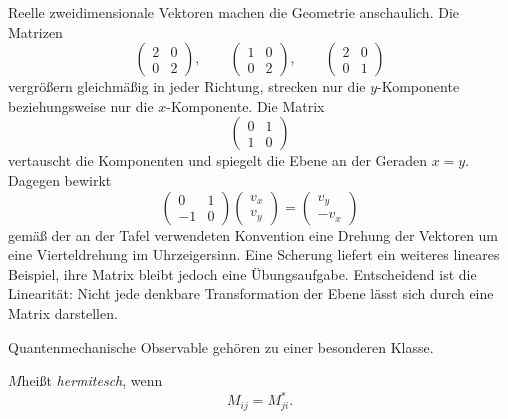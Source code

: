 Reelle zweidimensionale Vektoren machen die Geometrie anschaulich. Die Matrizen
\begin{equation}
  \begin{pmatrix}2&0\\0&2\end{pmatrix},
  \qquad
  \begin{pmatrix}1&0\\0&2\end{pmatrix},
  \qquad
  \begin{pmatrix}2&0\\0&1\end{pmatrix}
\end{equation}
vergrößern gleichmäßig in jeder Richtung, strecken nur die \(y\)-Komponente beziehungsweise nur die \(x\)-Komponente. Die Matrix
\begin{equation}
  \begin{pmatrix}0&1\\1&0\end{pmatrix}
\end{equation}
vertauscht die Komponenten und spiegelt die Ebene an der Geraden \(x=y\). Dagegen bewirkt
\begin{equation}
  \begin{pmatrix}0&1\\-1&0\end{pmatrix}
  \begin{pmatrix}v_x\\v_y\end{pmatrix}
  =
  \begin{pmatrix}v_y\\-v_x\end{pmatrix}
  \label{eq:l02-quarter-turn}
\end{equation}
gemäß der an der Tafel verwendeten Konvention eine Drehung der Vektoren um eine Vierteldrehung im Uhrzeigersinn. Eine Scherung liefert ein weiteres lineares Beispiel, ihre Matrix bleibt jedoch eine Übungsaufgabe. Entscheidend ist die Linearität: Nicht jede denkbare Transformation der Ebene lässt sich durch eine Matrix darstellen.

Quantenmechanische Observable gehören zu einer besonderen Klasse.

\begin{definition}\(M\)heißt \emph{hermitesch}, wenn
\begin{equation}
  M_{ij}=M_{ji}^*.
  \label{eq:l02-hermitian-condition}
\end{equation}\end{definition}


